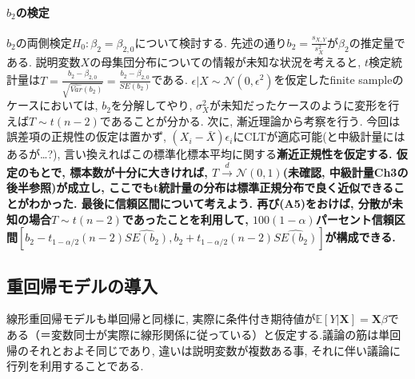 \documentclass[paper=a4paper,fontsize=10pt]{jlreq}
\begin{document}
\paragraph{$b_2$の検定}
$b_2$の両側検定$H_0: \beta_2=\beta_{2,0}$について検討する. 先述の通り$b_2=\frac{s_{X,Y}}{s^{2}_{X}}$が$\beta_2$の推定量である. 説明変数$X$の母集団分布についての情報が未知な状況を考えると, $t$検定統計量は$T=\frac{b_2-\beta_{2,0}}{\sqrt{\hat{Var}(b_2)}}=\frac{b_2-\beta_{2,0}}{SE(b_2)}$である. $\epsilon|X \sim \mathcal{N}(0,\epsilon^2)$を仮定したfinite sampleのケースにおいては, $b_2$を分解してやり, $\sigma_X^2$が未知だったケースのように変形を行えば$T \sim t(n-2)$であることが分かる. 次に, 漸近理論から考察を行う. 今回は誤差項の正規性の仮定は置かず, $(X_i-\bar{X})\epsilon_i$にCLTが適応可能(と中級計量にはあるが\dots?), 言い換えればこの標準化標本平均に関する\rmfamily\mcfamily\bfseries{漸近正規性}\mdseries を仮定する. 仮定のもとで, 標本数が十分に大きければ, $T \overset{d}{\to} \mathcal{N}(0,1)$\rmfamily\mcfamily\bfseries{(未確認, 中級計量Ch3の後半参照)}\mdseries が成立し, ここでもt統計量の分布は標準正規分布で良く近似できることがわかった. 最後に信頼区間について考えよう. 再び(A5)をおけば, 分散が未知の場合$T \sim t(n-2)$であったことを利用して, $100(1-\alpha)$パーセント信頼区間$[b_2 - t_{1-\alpha / 2}(n-2) \hat{SE(b_2)}, b_2 + t_{1-\alpha / 2}(n-2) \hat{SE(b_2)}]$が構成できる.\\

\subsection{重回帰モデルの導入}
線形重回帰モデルも単回帰と同様に, 実際に条件付き期待値が$\mathbb{E}[Y|\mathbf{X}]=\mathbf{X}\beta$である（＝変数同士が実際に線形関係に従っている）と仮定する.議論の筋は単回帰のそれとおよそ同じであり, 違いは説明変数が複数ある事, それに伴い議論に行列を利用することである. \\
\end{document}
